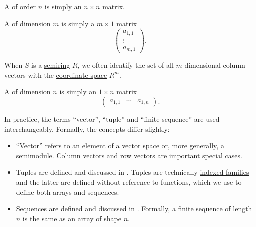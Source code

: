 \begin{definition}
\begin{thmenum}
     A  of order \( n \) is simply an \( n \times n \) matrix.

     A  of dimension \( m \) is simply a \( m \times 1 \) matrix
    \begin{equation*}
      \begin{pmatrix}
        a_{1,1} \\
        \vdots  \\
        a_{m,1}
      \end{pmatrix}.
    \end{equation*}

    When \( S \) is a \hyperref[def:semiring]{semiring} \( R \), we often identify the set of all \( m \)-dimensional column vectors with the \hyperref[def:sequence_space]{coordinate space} \( R^m \).

     A  of dimension \( n \) is simply an \( 1 \times n \) matrix
    \begin{equation*}
      \begin{pmatrix}
        a_{1,1} & \cdots & a_{1,n}
      \end{pmatrix}.
    \end{equation*}
  \end{thmenum}
\end{definition}

\begin{remark}\label{rem:vector_etymology}
  In practice, the terms \enquote{vector}, \enquote{tuple} and \enquote{finite sequence} are used interchangeably. Formally, the concepts differ slightly:

  \begin{itemize}
    \item \enquote{Vector} refers to an element of a \hyperref[def:vector_space]{vector space} or, more generally, a \hyperref[def:semimodule]{semimodule}. \hyperref[def:array/column_vector]{Column vectors} and \hyperref[def:array/row_vector]{row vectors} are important special cases.

    \item Tuples are defined and discussed in . Tuples are technically \hyperref[def:cartesian_product/indexed_family]{indexed families} and the latter are defined without reference to functions, which we use to define both arrays and sequences.

    \item Sequences are defined and discussed in . Formally, a finite sequence of length \( n \) is the same as an array of shape \( n \).
  \end{itemize}
\end{remark}

